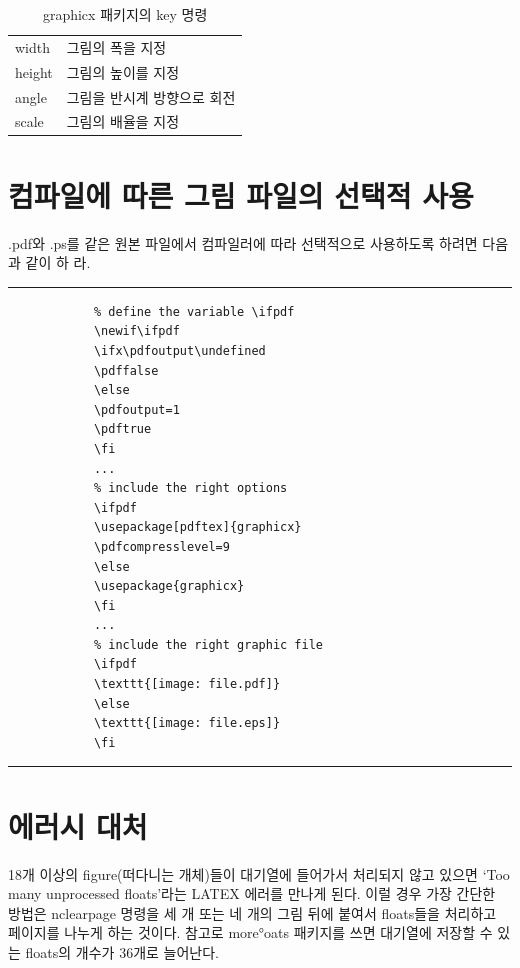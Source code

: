 \begin{table}[ht]
	\caption{graphicx 패키지의 key 명령}
	\centering
    \begin{tabular}{l l}
    \toprule
    width   & 그림의 폭을 지정   \\
    height  & 그림의 높이를 지정   \\
    angle   & 그림을 반시계 방향으로 회전   \\
    scale   & 그림의 배율을 지정  \\
    \bottomrule
    \end{tabular}%
  \label{table:keyname}%
\end{table}%




	\newpage
	\section{컴파일에 따른 그림 파일의 선택적 사용}

		.pdf와 .ps를 같은 원본 파일에서 컴파일러에 따라 선택적으로 사용하도록 하려면 다음과 같이 하
		라.
		
		\rule{\linewidth}{1.2pt}
		\begin{verbatim}
			% define the variable \ifpdf
			\newif\ifpdf
			\ifx\pdfoutput\undefined
			\pdffalse
			\else
			\pdfoutput=1
			\pdftrue
			\fi
			...
			% include the right options
			\ifpdf
			\usepackage[pdftex]{graphicx}
			\pdfcompresslevel=9
			\else
			\usepackage{graphicx}
			\fi
			...
			% include the right graphic file
			\ifpdf
			\texttt{[image: file.pdf]}
			\else
			\texttt{[image: file.eps]}
			\fi
		\end{verbatim}
		\rule{\linewidth}{1.2pt}

%
%
	\newpage
	\section{에러시 대처}

		18개 이상의 figure(떠다니는 개체)들이 대기열에 들어가서 처리되지 않고 있으면 ‘Too many
		unprocessed floats’라는 LATEX 에러를 만나게 된다. 이럴 경우 가장 간단한 방법은 nclearpage
		명령을 세 개 또는 네 개의 그림 뒤에 붙여서 floats들을 처리하고 페이지를 나누게 하는 것이다.
		참고로 more°oats 패키지를 쓰면 대기열에 저장할 수 있는 floats의 개수가 36개로 늘어난다.


